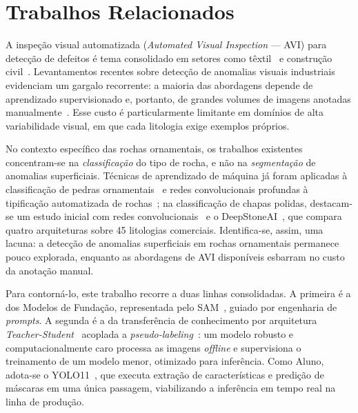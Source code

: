 \documentclass[10pt,conference]{IEEEtran}
\begin{document}
\section{Trabalhos Relacionados}

A inspeção visual automatizada (\textit{Automated Visual Inspection} --- AVI) para detecção de defeitos é tema consolidado em setores como têxtil~\cite{avi_textile_sikka2024} e construção civil~\cite{avi_concrete_waqar2024}. Levantamentos recentes sobre detecção de anomalias visuais industriais evidenciam um gargalo recorrente: a maioria das abordagens depende de aprendizado supervisionado e, portanto, de grandes volumes de imagens anotadas manualmente~\cite{avi_anomaly_li2025}. Esse custo é particularmente limitante em domínios de alta variabilidade visual, em que cada litologia exige exemplos próprios.

No contexto específico das rochas ornamentais, os trabalhos existentes concentram-se na \textit{classificação} do tipo de rocha, e não na \textit{segmentação} de anomalias superficiais. Técnicas de aprendizado de máquina já foram aplicadas à classificação de pedras ornamentais~\cite{stone_lopez2010} e redes convolucionais profundas à tipificação automatizada de rochas~\cite{rocktyping_baraboshkin2020}; na classificação de chapas polidas, destacam-se um estudo inicial com redes convolucionais~\cite{deepstone_araujo2022} e o DeepStoneAI~\cite{deepstoneai_moreira2025}, que compara quatro arquiteturas sobre 45 litologias comerciais. Identifica-se, assim, uma lacuna: a detecção de anomalias superficiais em rochas ornamentais permanece pouco explorada, enquanto as abordagens de AVI disponíveis esbarram no custo da anotação manual.

Para contorná-lo, este trabalho recorre a duas linhas consolidadas. A primeira é a dos Modelos de Fundação, representada pelo SAM~\cite{sam_kirillov2023}, guiado por engenharia de \textit{prompts}. A segunda é a da transferência de conhecimento por arquitetura \textit{Teacher-Student}~\cite{distill_hinton2015} acoplada a \textit{pseudo-labeling}~\cite{pseudolabel_lee2013}: um modelo robusto e computacionalmente caro processa as imagens \textit{offline} e supervisiona o treinamento de um modelo menor, otimizado para inferência. Como Aluno, adota-se o YOLO11~\cite{yolo11_khanam2024}, que executa extração de características e predição de máscaras em uma única passagem, viabilizando a inferência em tempo real na linha de produção.
\end{document}
